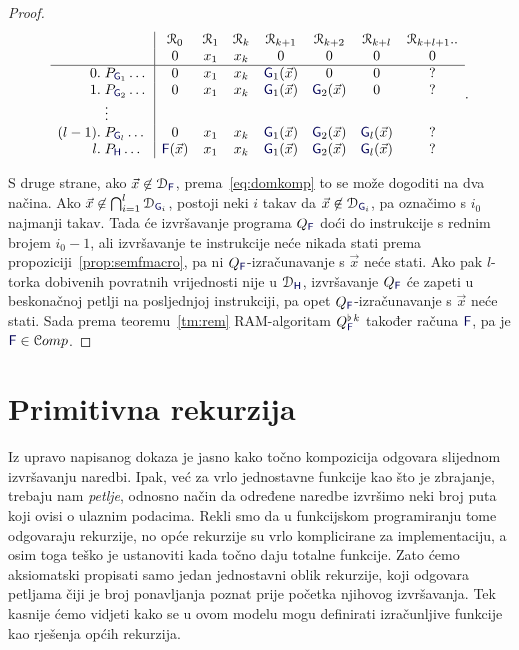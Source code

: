 \begin{proof}
\begin{equation}
\begin{array}{r@{\;}l|ccccccc}
      &               &\reg0       &\reg1&\reg{k}&\reg{k+1}     &\reg{k+2}     &\reg{k+l}     &\reg{k+l+1}..\\
      &               & 0          &x_1  &x_k    &0             &0             &0             &0            \\\hline
0.    &P_{\f G_1}\dots& 0          &x_1  &x_k    &\f G_1(\vec x)&0             &0             &?            \\
1.    &P_{\f G_2}\dots& 0          &x_1  &x_k    &\f G_1(\vec x)&\f G_2(\vec x)&0             &?            \\
      &\vdots                                                                                               \\
(l-1).&P_{\f G_l}\dots& 0          &x_1  &x_k    &\f G_1(\vec x)&\f G_2(\vec x)&\f G_l(\vec x)&?            \\
l.    &P_{\f H}\dots  &\f F(\vec x)&x_1  &x_k    &\f G_1(\vec x)&\f G_2(\vec x)&\f G_l(\vec x)&?
    \end{array}\text.
\end{equation}

S druge strane, ako $\vec x\not\in\dom{\f F}$, prema~\eqref{eq:domkomp} to se može dogoditi na dva načina. Ako $\vec x\not\in\bigcap_{i=1}^l\dom{\f G_i}$, postoji neki $i$ takav da $\vec x\not\in\dom{\f G_i}$, pa označimo s $i_0$ najmanji takav. Tada će izvršavanje programa $Q_{\f F}$ doći do instrukcije s rednim brojem $i_0-1$, ali izvršavanje te instrukcije neće nikada stati prema propoziciji~\ref{prop:semfmacro}, pa ni $Q_{\f F}$-izračunavanje s $\vec x$ neće stati. Ako pak $l$-torka dobivenih povratnih vrijednosti nije u $\dom{\f H}$, izvršavanje $Q_{\f F}$ će zapeti u beskonačnoj petlji na posljednjoj instrukciji, pa opet $Q_{\f F}$-izračunavanje s $\vec x$ neće stati.
Sada prema teoremu~\ref{tm:rem} RAM-algoritam $Q_{\f F}^{\flat\,k}$ također računa $\f F$, pa je $\f F\in\mathcal Comp$.
\end{proof}

\section{Primitivna rekurzija}

Iz upravo napisanog dokaza je jasno kako točno kompozicija odgovara slijednom iz\-vrša\-va\-nju naredbi. Ipak, već za vrlo jednostavne funkcije kao što je zbrajanje, trebaju nam \emph{petlje}, odnosno način da određene naredbe izvršimo neki broj puta koji ovisi o ulaznim podacima. Rekli smo da u funkcijskom programiranju tome odgovaraju rekurzije, no opće rekurzije su vrlo komplicirane za implementaciju, a osim toga teško je ustanoviti kada točno daju totalne funkcije. Zato ćemo aksiomatski propisati samo jedan jednostavni oblik rekurzije, koji odgovara petljama čiji je broj ponavljanja poznat prije početka njihovog izvršavanja. Tek kasnije ćemo vidjeti kako se u ovom modelu mogu definirati izračunljive funkcije kao rješenja općih rekurzija.

